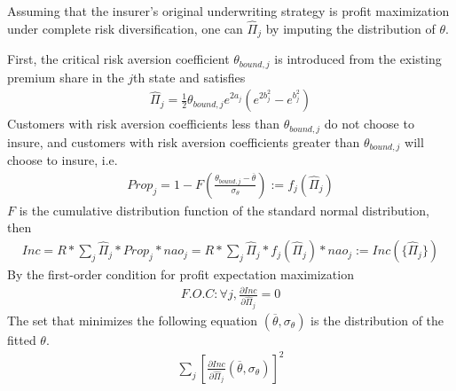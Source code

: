 \documentclass[12pt]{article}  %
\begin{document}
Assuming that the insurer's original underwriting strategy is profit maximization under complete risk diversification, one can $\widehat\Pi_j$ by imputing the distribution of $\theta$.

First, the critical risk aversion coefficient $\theta_{bound,j}$ is introduced from the existing premium share in the $j$th state and satisfies
\begin{align*}
    \widehat\Pi_{j} = \frac{1}{2}\theta_{bound,j} e^{2a_j}(e^{2b_j^2}-e^{b_j^2}) 
\end{align*}
Customers with risk aversion coefficients less than $\theta_{bound,j}$ do not choose to insure, and customers with risk aversion coefficients greater than $\theta_{bound,j}$ will choose to insure, i.e.
\begin{align*}
    Prop_j=1-F( \frac{\theta_{bound,j}- \overline{\theta} }{\sigma_\theta} ):=f_j(\widehat\Pi_j)
\end{align*}
$F$ is the cumulative distribution function of the standard normal distribution, then
\begin{align*}
Inc=R*\sum\limits_j \widehat\Pi_j*Prop_j*nao_j=R*\sum\limits_j \widehat
\Pi_j*f_j(\widehat\Pi_j)*nao_j:=Inc(\{\widehat\Pi_j\})
\end{align*}
By the first-order condition for profit expectation maximization
\begin{align*}
    F.O.C:{\forall}j, \frac{ \partial Inc }{ \partial \widehat\Pi_j }=0
\end{align*}
The set that minimizes the following equation $(\overline{\theta},\sigma_{\theta})$ is the distribution of the fitted $\theta$.
\begin{align*}
    \sum\limits_j [\frac{ \partial Inc }{ \partial \widehat\Pi_j }(\overline{\theta},\sigma_{\theta})]^2
\end{align*}
\end{document}
